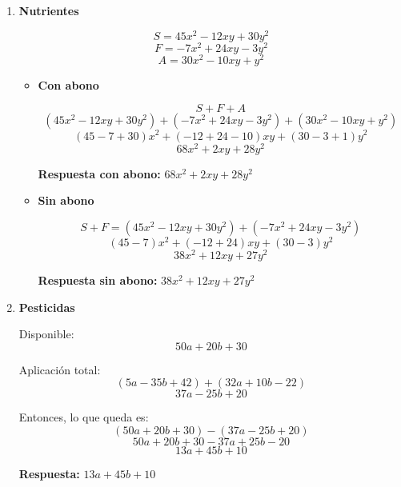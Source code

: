 \documentclass[12pt]{article}
\begin{document}
\begin{enumerate}[itemsep=0.9cm]
		\item \textbf{Nutrientes}
		
		\[
		S = 45x^2 - 12xy + 30y^2
		\]
		\[
		F = -7x^2 + 24xy - 3y^2
		\]
		\[
		A = 30x^2 - 10xy + y^2
		\]
		
		\begin{itemize}
			\item \textbf{Con abono}
			
			\[
			S+F+A
			\]
			\[
			(45x^2 - 12xy + 30y^2)+(-7x^2 + 24xy - 3y^2)+(30x^2 - 10xy + y^2)
			\]
			\[
			(45-7+30)x^2+(-12+24-10)xy+(30-3+1)y^2
			\]
			\[
			68x^2 + 2xy + 28y^2
			\]
			
			\textbf{Respuesta con abono:} \(\boxed{68x^2 + 2xy + 28y^2}\)
			
			\item \textbf{Sin abono}
			
			\[
			S+F=(45x^2 - 12xy + 30y^2)+(-7x^2 + 24xy - 3y^2)
			\]
			\[
			(45-7)x^2+(-12+24)xy+(30-3)y^2
			\]
			\[
			38x^2 + 12xy + 27y^2
			\]
			
			\textbf{Respuesta sin abono:} \(\boxed{38x^2 + 12xy + 27y^2}\)
		\end{itemize}
		
		\item \textbf{Pesticidas}
		
		Disponible:
		\[
		50a + 20b + 30
		\]
		
		Aplicación total:
		\[
		(5a - 35b + 42)+(32a + 10b - 22)
		\]
		\[
		37a - 25b + 20
		\]
		
		Entonces, lo que queda es:
		\[
		(50a + 20b + 30) - (37a - 25b + 20)
		\]
		\[
		50a + 20b + 30 - 37a + 25b - 20
		\]
		\[
		13a + 45b + 10
		\]
		
		\textbf{Respuesta:} \(\boxed{13a + 45b + 10}\)
		
	\end{enumerate}
	
\end{document}
